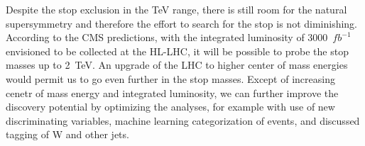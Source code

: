 Despite the stop exclusion in the TeV range, there is still room for the natural supersymmetry and therefore the effort to search for the stop is not diminishing. According to the CMS predictions, with the integrated luminosity of 3000~$fb^{-1}$ envisioned to be collected at the HL-LHC, it will be possible to probe the stop masses up to 2~TeV. An upgrade of the LHC to higher center of mass energies would permit us to go even further in the stop masses. Except of increasing cenetr of mass energy and integrated luminosity, we can further improve the discovery potential by optimizing the analyses, for example with use of new discriminating variables, machine learning categorization of events, and discussed tagging of W and other jets.

